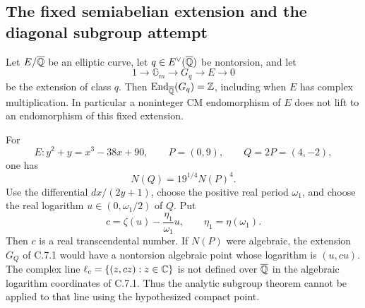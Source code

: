 \subsection{The fixed semiabelian extension and the diagonal subgroup attempt}

\begin{statement}
Let $E/\overline{\mathbb Q}$ be an elliptic curve, let
$q\in E^\vee(\overline{\mathbb Q})$ be nontorsion, and let
\[
 1\longrightarrow\mathbb G_m\longrightarrow G_q
       \longrightarrow E\longrightarrow0
\]
be the extension of class $q$. Then
$\operatorname{End}_{\overline{\mathbb Q}}(G_q)=\mathbb Z$, including when
$E$ has complex multiplication. In particular a noninteger
CM endomorphism of $E$ does not lift to an endomorphism of this
fixed extension.

For
\[
 E:y^2+y=x^3-38x+90,\qquad P=(0,9),\qquad Q=2P=(4,-2),
\]
one has
\[
 N(Q)=19^{1/4}N(P)^4.
\]
Use the differential $dx/(2y+1)$, choose the positive real
period $\omega_1$, and choose the real logarithm
$u\in(0,\omega_1/2)$ of $Q$. Put
\begin{equation}\label{eq:cd-slope}
 c=\zeta(u)-\frac{\eta_1}{\omega_1}u,
 \qquad \eta_1=\eta(\omega_1).
\end{equation}
Then $c$ is a real transcendental number. If $N(P)$ were
algebraic, the extension $G_Q$ of C.7.1 would have a
nontorsion algebraic point whose logarithm is $(u,cu)$.
The complex line
$\ell_c=\{(z,cz):z\in\mathbb C\}$ is not defined over
$\overline{\mathbb Q}$ in the algebraic logarithm coordinates of
C.7.1. Thus the analytic subgroup theorem cannot be applied
to that line using the hypothesized compact point.
\end{statement}
